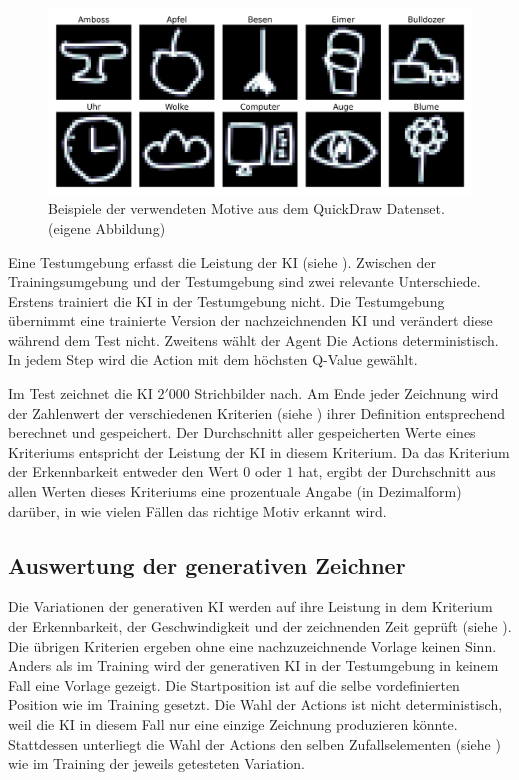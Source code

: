 \begin{figure}[!ht]
    \centering
    \includegraphics[width=\textwidth]{images/methode/quickdraw-examples.png}
    \caption{Beispiele der verwendeten Motive aus dem QuickDraw Datenset. (eigene Abbildung)}\label{fig:quickdraw-examples}
\end{figure}

Eine Testumgebung erfasst die Leistung der KI (siehe ).
Zwischen der Trainingsumgebung und der Testumgebung sind zwei relevante
Unterschiede. Erstens trainiert die KI in der Testumgebung nicht. Die
Testumgebung übernimmt eine trainierte Version der nachzeichnenden KI und
verändert diese während dem Test nicht. Zweitens wählt der Agent Die Actions
deterministisch. In jedem Step wird die Action mit dem höchsten Q-Value gewählt.

Im Test zeichnet die KI $2'000$ Strichbilder nach. Am Ende jeder Zeichnung wird
der Zahlenwert der verschiedenen Kriterien (siehe ) ihrer
Definition entsprechend berechnet und gespeichert. Der Durchschnitt aller
gespeicherten Werte eines Kriteriums entspricht der Leistung der KI in diesem
Kriterium. Da das Kriterium der Erkennbarkeit entweder den Wert $0$ oder $1$
hat, ergibt der Durchschnitt aus allen Werten dieses Kriteriums eine prozentuale
Angabe (in Dezimalform) darüber, in wie vielen Fällen das richtige Motiv erkannt
wird.

\subsection{Auswertung der generativen Zeichner}\label{sub:m_auswert_gen}

Die Variationen der generativen KI werden auf ihre Leistung in dem Kriterium der
Erkennbarkeit, der Geschwindigkeit und der zeichnenden Zeit geprüft (siehe
). Die übrigen Kriterien ergeben ohne eine
nachzuzeichnende Vorlage keinen Sinn. Anders als im Training wird der
generativen KI in der Testumgebung in keinem Fall eine Vorlage gezeigt. Die
Startposition ist auf die selbe vordefinierten Position wie im Training gesetzt.
Die Wahl der Actions ist nicht deterministisch, weil die KI in diesem Fall nur
eine einzige Zeichnung produzieren könnte. Stattdessen unterliegt die Wahl der
Actions den selben Zufallselementen (siehe ) wie im
Training der jeweils getesteten Variation.

